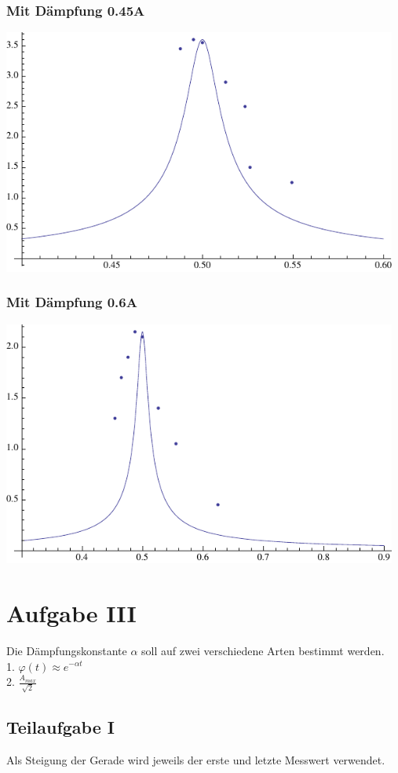 \documentclass[12pt,a4paper]{article}
\begin{document}
\subsubsection*{Mit D\"ampfung 0.45A}
\includegraphics[width=13cm]{plot22.pdf}
\subsubsection*{Mit D\"ampfung 0.6A}
\includegraphics[width=13cm]{plot21.pdf}

\section*{Aufgabe III}
Die D\"ampfungskonstante $\alpha$ soll auf zwei verschiedene Arten bestimmt werden.\\
1. $\varphi(t) \approx e^{-\alpha t}$ \\
2. $\frac{A_{max}}{\sqrt{2}}$\\

\subsection*{Teilaufgabe I}
Als Steigung der Gerade wird jeweils der erste und letzte Messwert verwendet.
\end{document}
